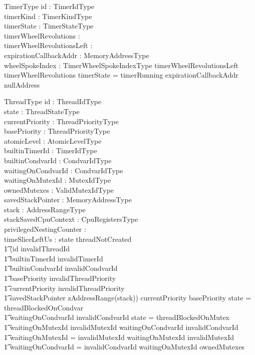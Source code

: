 \documentclass[11pt,letterpaper,twoside,openany]{book}
\begin{document}
\begin{schema}{TimerType}
   id : TimerIdType \\
   timerKind : TimerKindType \\
   timerState : TimerStateType \\
   timerWheelRevolutions : \nat \\
   timerWheelRevolutionsLeft : \nat \\
   expirationCallbackAddr : MemoryAddressType \\
   wheelSpokeIndex : TimerWheelSpokeIndexType
\where
   timerWheelRevolutionsLeft \leq timerWheelRevolutions
\also
   timerState = timerRunning \implies expirationCallbackAddr \neq nullAddress
\end{schema}

\begin{schema}{ThreadType}
   id : ThreadIdType \\
   state : ThreadStateType \\
   currentPriority : ThreadPriorityType \\
   basePriority : ThreadPriorityType \\
   atomicLevel : AtomicLevelType \\
   builtinTimerId : TimerIdType \\
   builtinCondvarId : CondvarIdType \\
   waitingOnCondvarId : CondvarIdType \\
   waitingOnMutexId : MutexIdType \\
   ownedMutexes : \iseq ValidMutexIdType \\
   savedStackPointer : MemoryAddressType \\
   stack : AddressRangeType \\
   stackSavedCpuContext : CpuRegistersType \\
   privilegedNestingCounter : \nat \\
   timeSliceLeftUs : \nat
\where
   state \neq threadNotCreated \implies \\
   \t1 (id \neq invalidThreadId \land \\
   \t1 builtinTimerId \neq invalidTimerId \land \\
   \t1 builtinCondvarId \neq invalidCondvarId \land \\
   \t1 basePriority \neq invalidThreadPriority \land \\
   \t1 currentPriority \neq invalidThreadPriority \land \\
   \t1 savedStackPointer \in zAddressRange(stack))
\also
   currentPriority \geq basePriority
\also
   state = threadBlockedOnCondvar \iff \\
   \t1 waitingOnCondvarId \neq invalidCondvarId
\also
   state = threadBlockedOnMutex \iff \\
   \t1  waitingOnMutexId \neq invalidMutexId
\also
   waitingOnCondvarId \neq invalidCondvarId \implies \\
   \t1 waitingOnMutexId = invalidMutexId
\also
   waitingOnMutexId \neq invalidMutexId \implies \\
   \t1 waitingOnCondvarId = invalidCondvarId
\also
   waitingOnMutexId \notin \ran ownedMutexes
\end{schema}
\end{document}

